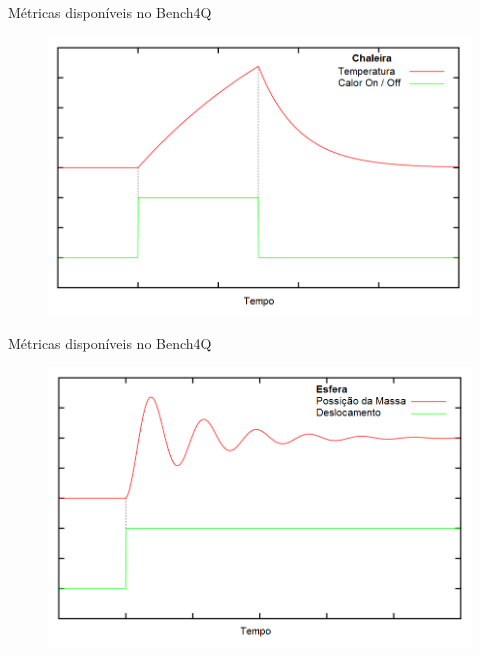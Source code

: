 \begin{frame}{Métricas disponíveis no Bench4Q}
	\begin{figure}[htb]
		\centering
		\includegraphics[scale=0.5]{../monograph/images/grafico-chaleira.png}	
	\end{figure}
\end{frame}

\begin{frame}{Métricas disponíveis no Bench4Q}
	\begin{figure}[htb]
		\centering
		\includegraphics[scale=0.5]{../monograph/images/grafico-mola.png}	
	\end{figure}
\end{frame}

